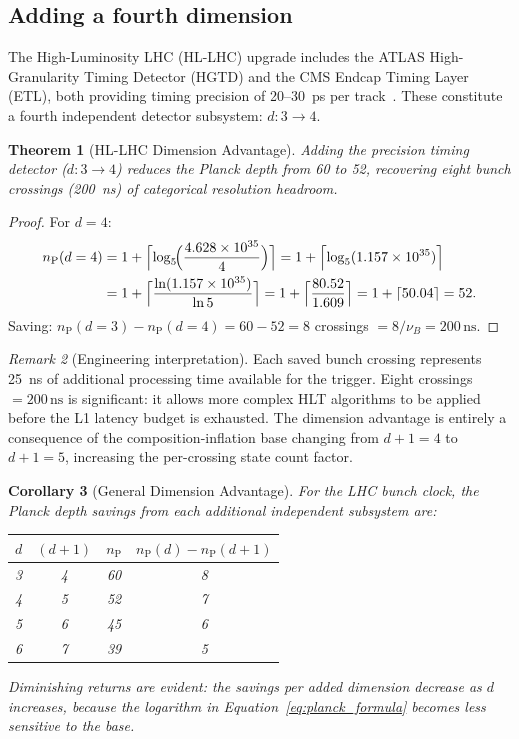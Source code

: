 \documentclass[twocolumn,10pt,a4paper]{article}
\theoremstyle{thmstyle}
\newtheorem{theorem}{Theorem}[section]
\newtheorem{corollary}[theorem]{Corollary}
\theoremstyle{definition}
\theoremstyle{remark}
\newtheorem{remark}[theorem]{Remark}
\newcommand{\nP}{n_{\mathrm{P}}}
\begin{document}
\subsection{Adding a fourth dimension}

The High-Luminosity LHC (HL-LHC) upgrade includes the ATLAS High-Granularity
Timing Detector (HGTD) and the CMS Endcap Timing Layer (ETL), both providing
timing precision of 20--30~ps per track~\citep{atlas_hgtd_tdr,cms_hllhc_tdr}.
These constitute a fourth independent detector subsystem: $d : 3 \to 4$.

\begin{theorem}[HL-LHC Dimension Advantage]
\label{thm:hllhc}
Adding the precision timing detector ($d : 3 \to 4$) reduces the Planck
depth from 60 to 52, recovering eight bunch crossings (200~ns) of
categorical resolution headroom.
\end{theorem}

\begin{proof}
For $d = 4$:
\begin{align}
\nP(d=4) &= 1 + \Bigl\lceil \log_5\!\Bigl(\frac{4.628\times 10^{35}}{4}\Bigr)\Bigr\rceil
= 1 + \Bigl\lceil \log_5(1.157\times 10^{35})\Bigr\rceil \notag\\
&= 1 + \Bigl\lceil \frac{\ln(1.157\times 10^{35})}{\ln 5}\Bigr\rceil
= 1 + \Bigl\lceil \frac{80.52}{1.609}\Bigr\rceil
= 1 + \lceil 50.04 \rceil = 52.
\end{align}
Saving: $\nP(d=3) - \nP(d=4) = 60 - 52 = 8$ crossings
$= 8/\nu_B = 200\,\mathrm{ns}$.
\end{proof}

\begin{remark}[Engineering interpretation]
Each saved bunch crossing represents 25~ns of additional processing time
available for the trigger. Eight crossings $= 200\,\mathrm{ns}$ is
significant: it allows more complex HLT algorithms to be applied before the
L1 latency budget is exhausted. The dimension advantage is entirely a
consequence of the composition-inflation base changing from $d+1 = 4$
to $d+1 = 5$, increasing the per-crossing state count factor.
\end{remark}

\begin{corollary}[General Dimension Advantage]
\label{cor:dimadvantage}
For the LHC bunch clock, the Planck depth savings from each additional
independent subsystem are:
\begin{center}
\begin{tabular}{cccc}
\toprule
$d$ & $(d+1)$ & $\nP$ & $\nP(d) - \nP(d+1)$ \\
\midrule
3 & 4 & 60 & 8 \\
4 & 5 & 52 & 7 \\
5 & 6 & 45 & 6 \\
6 & 7 & 39 & 5 \\
\bottomrule
\end{tabular}
\end{center}
Diminishing returns are evident: the savings per added dimension decrease
as $d$ increases, because the logarithm in Equation~\eqref{eq:planck_formula}
becomes less sensitive to the base.
\end{corollary}
\end{document}
